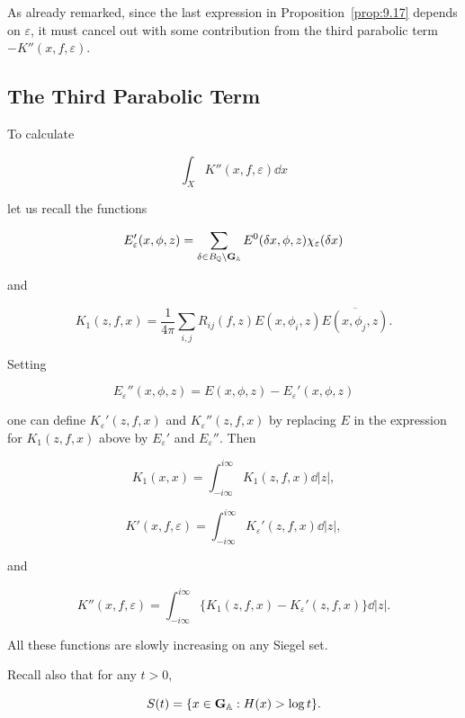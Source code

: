 As already remarked, since the last expression in Proposition~\ref{prop:9.17} depends on $\varepsilon$, it must cancel out with some contribution from the third parabolic term $-K''(x, f, \varepsilon)$.

\subsection{The Third Parabolic Term}

To calculate

\[
\int_X K''(x, f, \varepsilon)\dd x
\]

let us recall the functions

\[
E_\varepsilon'(x, \phi, z) = \sum_{\delta \in B_{\mathbb{Q}} \backslash \mathbf{G}_{\mathbb{A}}} E^0(\delta x, \phi, z)\chi_\varepsilon(\delta x)
\]

and

\begin{equation}\label{eq:9.53}
K_1(z, f, x) = \frac{1}{4\pi}\sum_{i, j} R_{ij}(f, z)E(x, \phi_i, z)\overline{E(x, \phi_j, z)}.\tag{9.53}
\end{equation}

Setting

\begin{equation}\label{eq:9.54}
E_\varepsilon''(x, \phi, z) = E(x, \phi, z) - E_\varepsilon'(x, \phi, z)\tag{9.54}
\end{equation}

one can define $K_\varepsilon'(z, f, x)$ and $K_\varepsilon''(z, f, x)$ by replacing $E$ in the expression for $K_1(z, f, x)$ above by $E_\varepsilon'$ and $E_\varepsilon''$. Then

\begin{equation}\label{eq:9.55}
K_1(x, x) = \int_{-i\infty}^{i\infty} K_1(z, f, x)\dd|z|,\tag{9.55}
\end{equation}

\[
K'(x, f, \varepsilon) = \int_{-i\infty}^{i\infty} K_\varepsilon'(z, f, x)\dd|z|,
\]

and

\begin{equation}\label{eq:9.56}
K''(x, f, \varepsilon) = \int_{-i\infty}^{i\infty}\{K_1(z, f, x) - K_\varepsilon'(z, f, x)\}\dd|z|.\tag{9.56}
\end{equation}

All these functions are slowly increasing on any Siegel set.

Recall also that for any $t > 0$,

\[
S(t) = \{x \in \mathbf{G}_{\mathbb{A}}: H(x) > \log t\}.
\]

